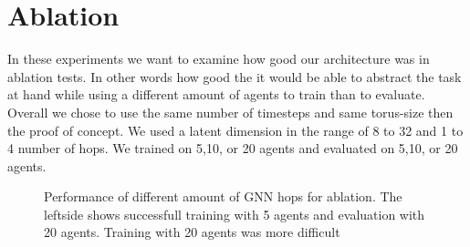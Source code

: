\section{Ablation}
\label{sec:Ablation}
In these experiments we want to examine how good our architecture was in ablation tests. In other words how good the it would be able to abstract the task at hand while using a different amount of agents to train than to evaluate. Overall we chose to use the same number of timesteps and same torus-size then the proof of concept. We used a latent dimension in the range of 8 to 32 and 1 to 4 number of hops. We trained on 5,10, or 20 agents and evaluated on 5,10, or 20 agents.

\begin{figure}[htp]
    \centering
    \hspace{1cm}                       
    \caption{Performance of different amount of GNN hops for ablation. The leftside shows successfull training with 5 agents and evaluation with 20 agents. Training with 20 agents was more difficult}
    \label{fig:ablation-5-20-20-5}
\end{figure}

